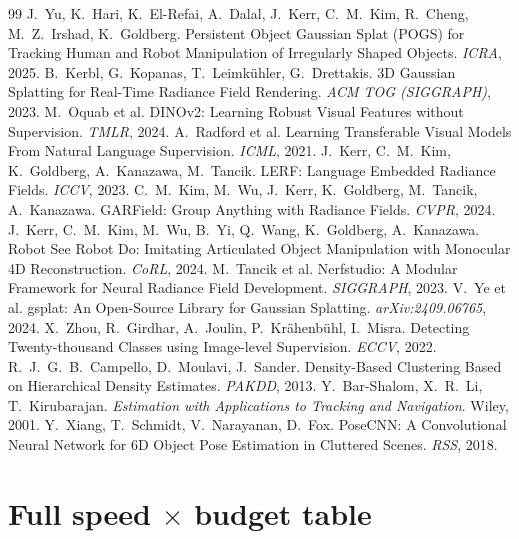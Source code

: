 \documentclass[10pt,a4paper]{article}
\begin{document}
\begin{thebibliography}{99}\small
{} J.~Yu, K.~Hari, K.~El-Refai, A.~Dalal, J.~Kerr, C.~M.~Kim, R.~Cheng,
  M.~Z.~Irshad, K.~Goldberg. Persistent Object Gaussian Splat (POGS) for Tracking
  Human and Robot Manipulation of Irregularly Shaped Objects. \emph{ICRA}, 2025.
 B.~Kerbl, G.~Kopanas, T.~Leimk\"uhler, G.~Drettakis. 3D Gaussian
  Splatting for Real-Time Radiance Field Rendering. \emph{ACM TOG (SIGGRAPH)}, 2023.
 M.~Oquab et al. DINOv2: Learning Robust Visual Features without
  Supervision. \emph{TMLR}, 2024.
 A.~Radford et al. Learning Transferable Visual Models From Natural
  Language Supervision. \emph{ICML}, 2021.
 J.~Kerr, C.~M.~Kim, K.~Goldberg, A.~Kanazawa, M.~Tancik. LERF: Language
  Embedded Radiance Fields. \emph{ICCV}, 2023.
 C.~M.~Kim, M.~Wu, J.~Kerr, K.~Goldberg, M.~Tancik, A.~Kanazawa.
  GARField: Group Anything with Radiance Fields. \emph{CVPR}, 2024.
 J.~Kerr, C.~M.~Kim, M.~Wu, B.~Yi, Q.~Wang, K.~Goldberg, A.~Kanazawa.
  Robot See Robot Do: Imitating Articulated Object Manipulation with Monocular 4D
  Reconstruction. \emph{CoRL}, 2024.
 M.~Tancik et al. Nerfstudio: A Modular Framework for Neural
  Radiance Field Development. \emph{SIGGRAPH}, 2023.
 V.~Ye et al. gsplat: An Open-Source Library for Gaussian Splatting.
  \emph{arXiv:2409.06765}, 2024.
 X.~Zhou, R.~Girdhar, A.~Joulin, P.~Kr\"ahenb\"uhl, I.~Misra. Detecting
  Twenty-thousand Classes using Image-level Supervision. \emph{ECCV}, 2022.
 R.~J.~G.~B.~Campello, D.~Moulavi, J.~Sander. Density-Based Clustering
  Based on Hierarchical Density Estimates. \emph{PAKDD}, 2013.
 Y.~Bar-Shalom, X.~R.~Li, T.~Kirubarajan. \emph{Estimation with
  Applications to Tracking and Navigation}. Wiley, 2001.
 Y.~Xiang, T.~Schmidt, V.~Narayanan, D.~Fox. PoseCNN: A Convolutional
  Neural Network for 6D Object Pose Estimation in Cluttered Scenes. \emph{RSS}, 2018.
\end{thebibliography}

\appendix
\section{Full speed $\times$ budget table}
\end{document}

